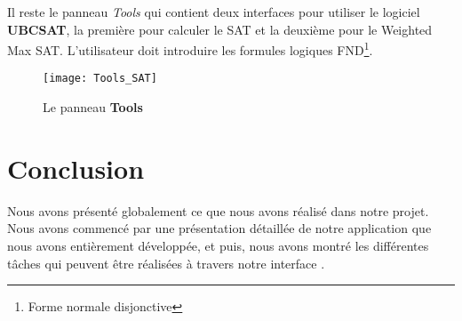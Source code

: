 Il reste le panneau \textit{Tools} qui contient deux interfaces pour utiliser le logiciel \textbf{UBCSAT}, la
première pour calculer le SAT et la deuxième pour le Weighted Max SAT. L'utilisateur doit introduire les formules
logiques FND\footnote{Forme normale disjonctive}.

\begin{figure}[H]
\centering
\texttt{[image: Tools\_SAT]}
\caption{Le panneau \textbf{Tools}}

\end{figure}

{}
\section*{Conclusion}

Nous avons présenté globalement ce que nous avons réalisé dans notre projet. Nous avons commencé par une
présentation détaillée de notre application \appname que nous avons entièrement développée, et puis, nous
avons montré les différentes tâches qui peuvent être réalisées à travers notre interface \platformename.
